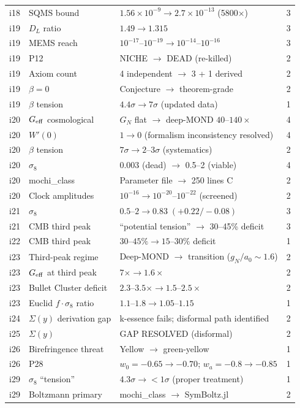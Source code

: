 \documentclass[11pt,a4paper]{article}
\newcommand{\ee}[1]{\times 10^{#1}}
\begin{document}
\begin{longtable}{p{1cm}p{5cm}p{5cm}p{2cm}}
i18 & SQMS bound & $1.56\ee{-9} \to 2.7\ee{-13}$ (5800$\times$) & 3 \\
i19 & $D_L$ ratio & $1.49 \to 1.315$ & 3 \\
i19 & MEMS reach & $10^{-17}$--$10^{-19} \to 10^{-14}$--$10^{-16}$ & 3 \\
i19 & P12 & NICHE $\to$ DEAD (re-killed) & 2 \\
i19 & Axiom count & 4 independent $\to$ 3 + 1 derived & 2 \\
i19 & $\beta = 0$ & Conjecture $\to$ theorem-grade & 2 \\
i19 & $\beta$ tension & $4.4\sigma \to 7\sigma$ (updated data) & 1 \\
i20 & $G_{\rm eff}$ cosmological & $G_N$ flat $\to$ deep-MOND $40$--$140\times$ & 4 \\
i20 & $W'(0)$ & $1 \to 0$ (formalism inconsistency resolved) & 4 \\
i20 & $\beta$ tension & $7\sigma \to 2$--$3\sigma$ (systematics) & 2 \\
i20 & $\sigma_8$ & 0.003 (dead) $\to$ 0.5--2 (viable) & 4 \\
i20 & mochi\_class & Parameter file $\to$ 250 lines C & 2 \\
i20 & Clock amplitudes & $10^{-16} \to 10^{-20}$--$10^{-22}$ (screened) & 2 \\
i21 & $\sigma_8$ & $0.5$--$2 \to 0.83\;(+0.22/-0.08)$ & 3 \\
i21 & CMB third peak & ``potential tension'' $\to$ 30--45\% deficit & 3 \\
i22 & CMB third peak & $30$--$45\% \to 15$--$30\%$ deficit & 1 \\
i23 & Third-peak regime & Deep-MOND $\to$ transition ($g_N/a_0 \sim 1.6$) & 2 \\
i23 & $G_{\rm eff}$ at third peak & $7\times \to 1.6\times$ & 2 \\
i23 & Bullet Cluster deficit & $2.3$--$3.5\times \to 1.5$--$2.5\times$ & 2 \\
i23 & Euclid $f \cdot \sigma_8$ ratio & $1.1$--$1.8 \to 1.05$--$1.15$ & 1 \\
i24 & $\Sigma(y)$ derivation gap & k-essence fails; disformal path identified & 2 \\
i25 & $\Sigma(y)$ & GAP RESOLVED (disformal) & 2 \\
i26 & Birefringence threat & Yellow $\to$ green-yellow & 1 \\
i26 & P28 & $w_0 = -0.65 \to -0.70$; $w_a = -0.8 \to -0.85$ & 1 \\
i29 & $\sigma_8$ ``tension'' & $4.3\sigma \to < 1\sigma$ (proper treatment) & 1 \\
i29 & Boltzmann primary & mochi\_class $\to$ SymBoltz.jl & 2 \\

\bottomrule
\end{longtable}
\end{document}
